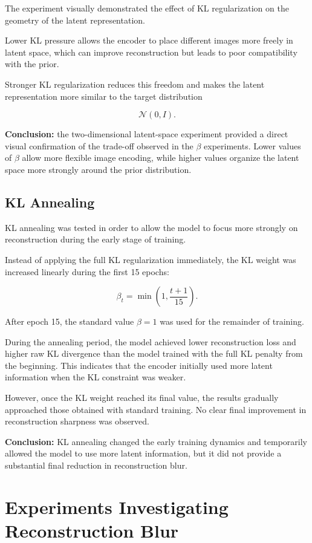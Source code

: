 \documentclass[a4paper,11pt]{article}
\begin{document}
The experiment visually demonstrated the effect of KL regularization on the geometry of the latent representation.

Lower KL pressure allows the encoder to place different images more freely in latent space, which can improve reconstruction but leads to poor compatibility with the prior.

Stronger KL regularization reduces this freedom and makes the latent representation more similar to the target distribution

\[
\mathcal{N}(0,I).
\]

\textbf{Conclusion:} the two-dimensional latent-space experiment provided a direct visual confirmation of the trade-off observed in the $\beta$ experiments. Lower values of $\beta$ allow more flexible image encoding, while higher values organize the latent space more strongly around the prior distribution.


\subsection{KL Annealing}

KL annealing was tested in order to allow the model to focus more strongly on reconstruction during the early stage of training.

Instead of applying the full KL regularization immediately, the KL weight was increased linearly during the first 15 epochs:

\[
\beta_t
=
\min\left(
1,
\frac{t+1}{15}
\right).
\]

After epoch 15, the standard value $\beta=1$ was used for the remainder of training.

During the annealing period, the model achieved lower reconstruction loss and higher raw KL divergence than the model trained with the full KL penalty from the beginning. This indicates that the encoder initially used more latent information when the KL constraint was weaker.

However, once the KL weight reached its final value, the results gradually approached those obtained with standard training. No clear final improvement in reconstruction sharpness was observed.

\textbf{Conclusion:} KL annealing changed the early training dynamics and temporarily allowed the model to use more latent information, but it did not provide a substantial final reduction in reconstruction blur.


\section{Experiments Investigating Reconstruction Blur}
\end{document}
